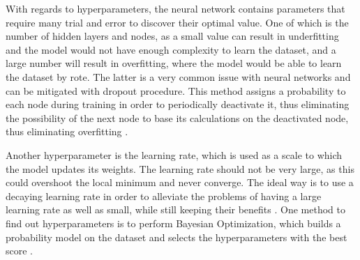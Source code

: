 With regards to hyperparameters, the neural network contains parameters that require many trial and error to discover their optimal value. One of which is the number of hidden layers and nodes, as a small value can result in underfitting and the model would not have enough complexity to learn the dataset, and a large number will result in overfitting, where the model would be able to learn the dataset by rote. The latter is a very common issue with neural networks and can be mitigated with dropout procedure. This method assigns a probability to each node during training in order to periodically deactivate it, thus eliminating the possibility of the next node to base its calculations on the deactivated node, thus eliminating overfitting \citep{Srivastava:2014:DSW:2627435.2670313}.

Another hyperparameter is the learning rate, which is used as a scale to which the model updates its weights. The learning rate should not be very large, as this could overshoot the local minimum and never converge. The ideal way is to use a decaying learning rate in order to alleviate the problems of having a large learning rate as well as small, while still keeping their benefits \cite{jacobs1988increased}. One method to find out hyperparameters is to perform Bayesian Optimization, which builds a probability model on the dataset and selects the hyperparameters with the best score \cite{eggensperger2013towards}. 

